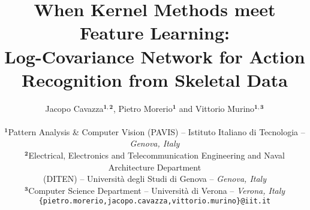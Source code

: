 \documentclass[10pt,twocolumn]{article}
\begin{document}
\title{When Kernel Methods meet Feature Learning: \\ Log-Covariance Network for Action Recognition from Skeletal Data}

\author{Jacopo Cavazza$^{\pmb{1},\pmb{2}}$, Pietro Morerio$^{\pmb 1}$ and Vittorio Murino$^{ \pmb{1},\pmb{3}}$\\ \\
	$^{\pmb 1}$Pattern Analysis \& Computer Vision (PAVIS) -- Istituto Italiano di Tecnologia -- \textit{Genova, Italy} \\
	$^{\pmb 2}$Electrical, Electronics and Telecommunication Engineering and Naval Architecture Department \\ (DITEN) -- Universit\`{a} degli Studi di Genova --  \textit{Genova, Italy}\\
	$^{\pmb 3}$Computer Science Department -- Universit\`{a} di Verona --  \textit{Verona, Italy} \\
	{\tt\small \{pietro.morerio,jacopo.cavazza,vittorio.murino\}@iit.it}}

\maketitle
\thispagestyle{empty}
\end{document}
